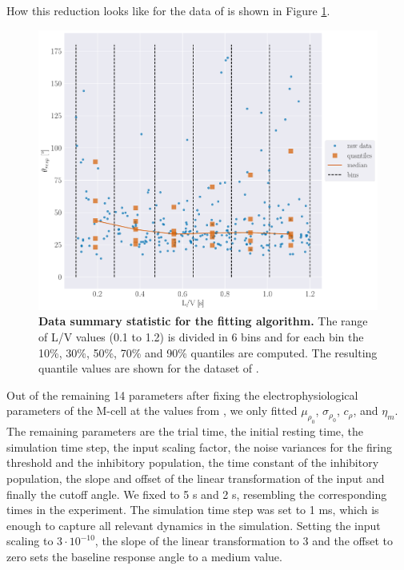     How this reduction looks like for the data of \cite{Bhattacharyya2017} is shown in Figure \ref{fig:expm_data_to_quantiles}.\\
    \begin{figure}[H]
    	\begin{center}
			\includegraphics[width=\textwidth]{figure_data_to_quant.pdf}
    	\end{center}
    	\caption{\textbf{Data summary statistic for the fitting algorithm.} The range of L/V values (0.1 to 1.2) is divided in 6 bins and for each bin the 10\%, 30\%, 50\%, 70\% and 90\% quantiles are computed. The resulting quantile values are shown for the dataset of \cite{Bhattacharyya2017}.}
    	\label{fig:expm_data_to_quantiles}
    \end{figure}
    Out of the remaining 14 parameters after fixing the electrophysiological parameters of the M-cell at the values from \cite{Koyama2016}, we only fitted $\mu_{\rho_{0}}$, $\sigma_{\rho_{0}}$, $c_{\rho}$, and $\eta_{m}$.
    The remaining parameters are the trial time, the initial resting time, the simulation time step, the input scaling factor, the noise variances for the firing threshold and the inhibitory population, the time constant of the inhibitory population, the slope and offset of the linear transformation of the input and finally the cutoff angle.
    We fixed to 5 s and 2 s, resembling the corresponding times in the experiment.
    The simulation time step was set to 1 ms, which is enough to capture all relevant dynamics in the simulation.
    Setting the input scaling to $3 \cdot 10^{-10}$, the slope of the linear transformation to 3 and the offset to zero sets the baseline response angle to a medium value.
